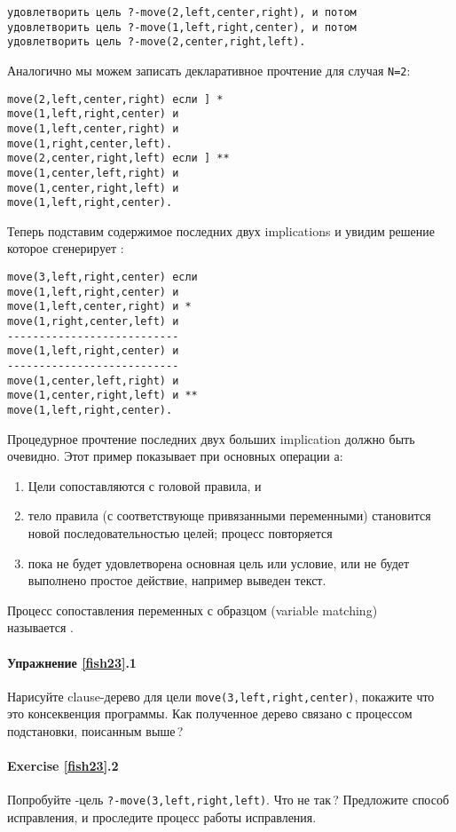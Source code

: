 \begin{verbatim}
удовлетворить цель ?-move(2,left,center,right), и потом 
удовлетворить цель ?-move(1,left,right,center), и потом 
удовлетворить цель ?-move(2,center,right,left). 
\end{verbatim}

Аналогично мы можем записать декларативное прочтение для случая \verb|N=2|:

\begin{verbatim}
move(2,left,center,right) если ] * 
move(1,left,right,center) и 
move(1,left,center,right) и 
move(1,right,center,left). 
move(2,center,right,left) если ] ** 
move(1,center,left,right) и
move(1,center,right,left) и 
move(1,left,right,center). 
\end{verbatim}

Теперь подставим содержимое последних двух implications и увидим решение которое
сгенерирует \prolog:

\begin{verbatim}
move(3,left,right,center) если 
move(1,left,right,center) и 
move(1,left,center,right) и * 
move(1,right,center,left) и 
--------------------------- 
move(1,left,right,center) и 
--------------------------- 
move(1,center,left,right) и 
move(1,center,right,left) и ** 
move(1,left,right,center). 
\end{verbatim}

Процедурное прочтение последних двух больших implication должно быть очевидно.
Этот пример показывает при основных операции \prolog а:
\begin{enumerate}[nosep]
  \item
Цели сопоставляются с головой правила, и
  \item 
тело правила (с соответствующе привязанными переменными) становится новой
последовательностью целей; процесс повторяется 
  \item 
пока не будет удовлетворена основная цель или условие, или не будет выполнено
простое действие, например выведен текст.
\end{enumerate}

\begin{framed}\noindent
Процесс сопоставления переменных с образцом (variable matching)\\
называется .
\end{framed}

\paragraph{Упражнение \ref{fish23}.1} Нарисуйте clause-дерево для цели
\verb'move(3,left,right,center)', покажите что это консеквенция программы. Как
полученное дерево связано с процессом подстановки, поисанным выше\,?

\paragraph{Exercise \ref{fish23}.2} Попробуйте \prolog-цель
\verb|?-move(3,left,right,left)|. Что не так\,? Предложите способ
исправления, и проследите процесс работы исправления.
